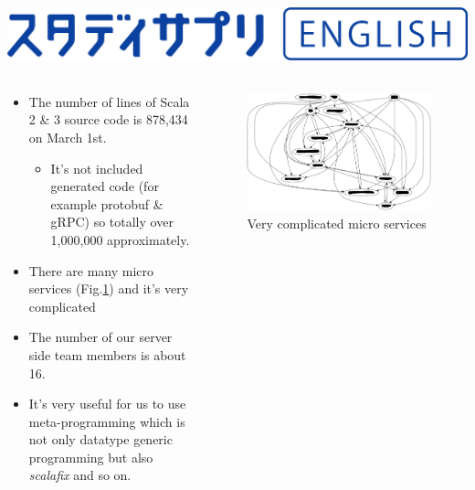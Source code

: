 \begin{frame}
  \frametitle{\includegraphics[height=3ex]{img/01_Study_Sapuri_English_Horizontal.png}}

  \begin{columns}
    \begin{column}{0.6\textwidth}
      \begin{itemize}
        \item The number of lines of Scala 2 \& 3 source code is 878,434 on March 1st.
        \begin{itemize}
          \item It's not included generated code (for example protobuf \& gRPC) so totally over 1,000,000 approximately.
        \end{itemize}

        \item There are many micro services (Fig.\ref{fig:graph}) and it's very complicated

        \item The number of our server side team members is about 16.

        \item It's very useful for us to use meta-programming
        which is not only datatype generic programming but also \emph{scalafix} and so on.
      \end{itemize}
    \end{column}
    \begin{column}{0.4\textwidth}
      \begin{figure}[h]
        \includegraphics[width=\columnwidth]{img/graph.png}
        \caption{Very complicated micro services}
        \label{fig:graph}
      \end{figure}
    \end{column}
  \end{columns}


\end{frame}
